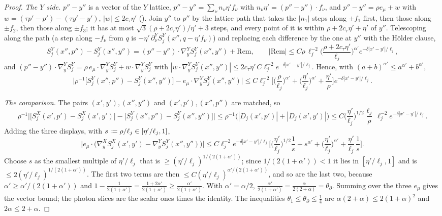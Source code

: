 \begin{proof}
\emph{The $Y$ side.} $p''-y''$ is a vector of the $Y$ lattice, $p''-y''=\sum_\nu n_\nu\eta'f_\nu$ with $n_\nu\eta'=(p''-y'')\cdot f_\nu$, and $p''-y''=\rho e_\mu+w$ with $w=(\tau p'-p')-(\tau y'-y')$, $|w|\le2c_\tau\eta'$ (). Join $y''$ to $p''$ by the lattice path that takes the $|n_1|$ steps along $\pm f_1$ first, then those along $\pm f_2$, then those along $\pm f_3$; it has at most $\sqrt3(\rho+2c_\tau\eta')/\eta'+3$ steps, and every point of it is within $\rho+2c_\tau\eta'+\eta'$ of $y''$. Telescoping along the path (a step along $-f_\nu$ from $q$ is $-\eta'\,\partial^Y_\nu S^Y_j(x'',q-\eta'f_\nu)$) and replacing each difference by the one at $y''$ with the H\"older clause,
\[
S^Y_j(x'',p'')-S^Y_j(x'',y'')=(p''-y'')\cdot\nabla^Y_yS^Y_j(x'',y'')+\mathrm{Rem},\qquad|\mathrm{Rem}|\le C\rho\,\ell_j^{-2}\Big(\frac{\rho+2c_\tau\eta'}{\ell_j}\Big)^{\alpha'}e^{-\delta|x'-y'|/\ell_j},
\]
and $(p''-y'')\cdot\nabla^Y_yS^Y_j=\rho\,e_\mu\cdot\nabla^Y_yS^Y_j+w\cdot\nabla^Y_yS^Y_j$ with $|w\cdot\nabla^Y_yS^Y_j(x'',y'')|\le2c_\tau\eta'\,C\ell_j^{-2}e^{-\delta|x'-y'|/\ell_j}$. Hence, with $(a+b)^{\alpha'}\le a^{\alpha'}+b^{\alpha'}$,
\[
\Big|\rho^{-1}\big[S^Y_j(x'',p'')-S^Y_j(x'',y'')\big]-e_\mu\cdot\nabla^Y_yS^Y_j(x'',y'')\Big|\le C\ell_j^{-2}\Big[\Big(\frac{\rho}{\ell_j}\Big)^{\alpha'}+\Big(\frac{\eta'}{\ell_j}\Big)^{\alpha'}+\frac{\eta'}{\rho}\Big]e^{-\delta|x'-y'|/\ell_j}.
\]

\emph{The comparison.} The pairs $(x',y'),(x'',y'')$ and $(x',p'),(x'',p'')$ are matched, so
\[
\rho^{-1}\Big|\big[S^X_j(x',p')-S^X_j(x',y')\big]-\big[S^Y_j(x'',p'')-S^Y_j(x'',y'')\big]\Big|\le\rho^{-1}\big(|D_j(x',p')|+|D_j(x',y')|\big)\le C\Big(\frac{\eta'}{\ell_j}\Big)^{1/2}\frac{\ell_j}{\rho}\,\ell_j^{-2}e^{-\delta|x'-y'|/\ell_j}.
\]
Adding the three displays, with $s:=\rho/\ell_j\in[\eta'/\ell_j,1]$,
\[
\big|e_\mu\cdot\big(\nabla^X_yS^X_j(x',y')-\nabla^Y_yS^Y_j(x'',y'')\big)\big|\le C\ell_j^{-2}e^{-\delta|x'-y'|/\ell_j}\Big[\Big(\frac{\eta'}{\ell_j}\Big)^{1/2}\frac1s+s^{\alpha'}+\Big(\frac{\eta'}{\ell_j}\Big)^{\alpha'}+\frac{\eta'}{\ell_j}\,\frac1s\Big].
\]
Choose $s$ as the smallest multiple of $\eta'/\ell_j$ that is $\ge(\eta'/\ell_j)^{1/(2(1+\alpha'))}$; since $1/(2(1+\alpha'))<1$ it lies in $[\eta'/\ell_j,1]$ and is $\le2(\eta'/\ell_j)^{1/(2(1+\alpha'))}$. The first two terms are then $\le C(\eta'/\ell_j)^{\alpha'/(2(1+\alpha'))}$, and so are the last two, because $\alpha'\ge\alpha'/(2(1+\alpha'))$ and $1-\frac1{2(1+\alpha')}=\frac{1+2\alpha'}{2(1+\alpha')}\ge\frac{\alpha'}{2(1+\alpha')}$. With $\alpha'=\alpha/2$, $\frac{\alpha'}{2(1+\alpha')}=\frac{\alpha}{2(2+\alpha)}=\theta_\partial$. Summing over the three $e_\mu$ gives the vector bound; the photon slices are the scalar ones times the identity. The inequalities $\theta_1\le\theta_\partial\le\frac14$ are $\alpha(2+\alpha)\le2(1+\alpha)^2$ and $2\alpha\le2+\alpha$.
\end{proof}
